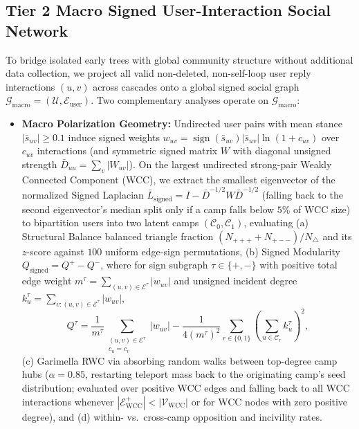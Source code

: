 \documentclass[conference]{IEEEtran}
\begin{document}
\subsection{Tier 2 Macro Signed User-Interaction Social Network}
To bridge isolated early trees with global community structure without additional data collection, we project all valid non-deleted, non-self-loop user reply interactions $(u, v)$ across cascades onto a global signed social graph $\mathcal{G}_{\text{macro}} = (\mathcal{U}, \mathcal{E}_{\text{user}})$. Two complementary analyses operate on $\mathcal{G}_{\text{macro}}$:
\begin{itemize}
    \item \textbf{Macro Polarization Geometry:} Undirected user pairs with mean stance $|\bar{s}_{uv}| \ge 0.1$ induce signed weights $w_{uv} = \operatorname{sign}(\bar{s}_{uv}) |\bar{s}_{uv}| \ln(1 + c_{uv})$ over $c_{uv}$ interactions (and symmetric signed matrix $W$ with diagonal unsigned strength $\bar{D}_{uu} = \sum_v |W_{uv}|$). On the largest undirected strong-pair Weakly Connected Component (WCC), we extract the smallest eigenvector of the normalized Signed Laplacian \cite{kunegis2010spectral} $\bar{L}_{\text{signed}} = I - \bar{D}^{-1/2} W \bar{D}^{-1/2}$ (falling back to the second eigenvector's median split only if a camp falls below $5\%$ of WCC size) to bipartition users into two latent camps $(\mathcal{C}_0, \mathcal{C}_1)$, evaluating (a) Structural Balance \cite{cartwright1956structural} balanced triangle fraction $(N_{+++} + N_{+--})/N_{\triangle}$ and its $z$-score against $100$ uniform edge-sign permutations, (b) Signed Modularity $Q_{\text{signed}} = Q^+ - Q^-$, where for sign subgraph $\tau \in \{+, -\}$ with positive total edge weight $m^\tau = \sum_{(u,v)\in \mathcal{E}^\tau} |w_{uv}|$ and unsigned incident degree $k_u^\tau = \sum_{v:(u,v)\in \mathcal{E}^\tau} |w_{uv}|$,
    \[
    Q^\tau = \frac{1}{m^\tau}\sum_{\substack{(u,v)\in \mathcal{E}^\tau \\ c_u = c_v}} |w_{uv}| - \frac{1}{4(m^\tau)^2}\sum_{r \in \{0, 1\}}\left(\sum_{u \in \mathcal{C}_r} k_u^\tau\right)^{\!2},
    \]
    (c) Garimella RWC \cite{garimella2018quantifying} via absorbing random walks between top-degree camp hubs ($\alpha = 0.85$, restarting teleport mass back to the originating camp's seed distribution; evaluated over positive WCC edges and falling back to all WCC interactions whenever $|\mathcal{E}^+_{\text{WCC}}| < |\mathcal{V}_{\text{WCC}}|$ or for WCC nodes with zero positive degree), and (d) within- vs.\ cross-camp opposition and incivility rates.

\end{itemize}
\end{document}
